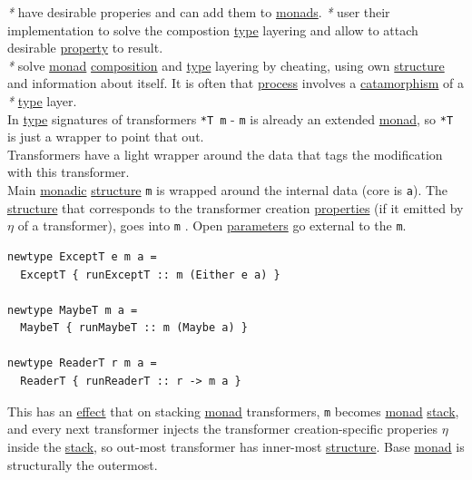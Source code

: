 \documentclass[a4paper,14pt,oneside]{book}
\begin{document}
{\emph{*} have desirable properies and can add them to \hyperref[org7e5e6f7]{monads}. \emph{*} user their implementation to solve the compostion \hyperref[orga9ca243]{type} layering and allow to attach desirable \hyperref[org2731790]{property} to result.\\

\emph{*} solve \hyperref[org90c21ab]{monad} \hyperref[orgd27cab7]{composition} and \hyperref[orga9ca243]{type} layering by cheating, using own \hyperref[org080800e]{structure} and information about itself. It is often that \hyperref[orgada3bb8]{process} involves a \hyperref[org524224c]{catamorphism} of a \emph{*} \hyperref[orga9ca243]{type} layer.\\

In \hyperref[orga9ca243]{type} signatures of transformers \texttt{*T m} - \texttt{m} is already an extended \hyperref[org90c21ab]{monad}, so \texttt{*T} is just a wrapper to point that out.\\

Transformers have a light wrapper around the data that tags the modification with this transformer.\\

Main \hyperref[orgbea0cab]{monadic} \hyperref[org080800e]{structure} \texttt{m} is wrapped around the internal data (core is \texttt{a}). The \hyperref[org080800e]{structure} that corresponds to the transformer creation \hyperref[org5fc06ca]{properties} (if it emitted by \(\eta\) of a transformer), goes into \texttt{m} . Open \hyperref[org1f91d4a]{parameters} go external to the \texttt{m}.\\

\begin{verbatim}
newtype ExceptT e m a =
  ExceptT { runExceptT :: m (Either e a) }

newtype MaybeT m a =
  MaybeT { runMaybeT :: m (Maybe a) }

newtype ReaderT r m a =
  ReaderT { runReaderT :: r -> m a }
\end{verbatim}

This has an \hyperref[orgbedd682]{effect} that on stacking \hyperref[org90c21ab]{monad} transformers, \texttt{m} becomes \hyperref[org90c21ab]{monad} \hyperref[org507f473]{stack}, and every next transformer injects the transformer creation-specific properies \(\eta\) inside the \hyperref[org507f473]{stack}, so out-most transformer has inner-most \hyperref[org080800e]{structure}. Base \hyperref[org90c21ab]{monad} is structurally the outermost.\\

}
\end{document}
